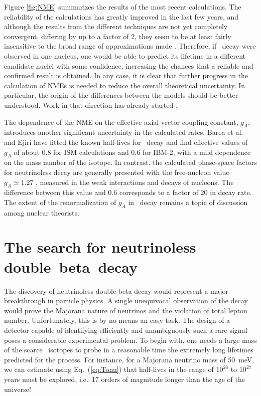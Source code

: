 \documentclass{PoS}
\begin{document}
Figure \ref{fig:NME} summarizes the results of the most recent calculations. The reliability of the calculations has greatly improved in the last few years, and although the results from the different techniques are not yet completely convergent, differing by up to a factor of 2, they seem to be at least fairly insensitive to the broad range of approximations made \cite{Vogel:2012ja}. Therefore, if \bbonu\ decay were observed in one nucleus, one would be able to predict its lifetime in a different candidate nuclei with some confidence, increasing the chances that a reliable and confirmed result is obtained. In any case, it is clear that further progress in the calculation of NMEs is needed to reduce the overall theoretical uncertainty. In particular, the origin of the differences between the models should be better understood. Work in that direction has already started \cite{Menendez:2014ena}.

The dependence of the NME on the effective axial-vector coupling constant, $g_{A}$, introduces another significant uncertainty in the calculated rates. Barea et al.\ \cite{Barea:2013bz} and Ejiri \cite{Ejiri:2010zza} have fitted the known half-lives for \bbtnu\ decay and find effective values of $g_{A}$ of about 0.8 for ISM calculations and 0.6 for IBM-2, with a mild dependence on the mass number of the isotope. In contrast, the calculated phase-space factors for neutrinoless decay are generally presented with the free-nucleon value $g_{A} \simeq1.27$ \cite{Agashe:2014kda}, measured in the weak interactions and decays of nucleons. The difference between this value and 0.6 corresponds to a factor of 20 in decay rate. The extent of the renormalization of $g_{A}$ in \bbonu\ decay remains a topic of discussion among nuclear theorists.
 
\section{The search for neutrinoless \mbox{double beta decay}} 
The discovery of neutrinoless double beta decay would represent a major breakthrough in particle physics. A single unequivocal observation of the decay would prove the Majorana nature of neutrinos and the violation of total lepton number. Unfortunately, this is by no means an easy task. The design of a detector capable of identifying efficiently and unambiguously such a rare signal poses a considerable experimental problem. To begin with, one needs a large mass of the scarce \bb\ isotopes to probe in a reasonable time the extremely long lifetimes predicted for the process. For instance, for a Majorana neutrino mass of 50~meV, we can estimate using Eq.~(\ref{eq:Tonu}) that half-lives in the range of $10^{26}$ to $10^{27}$ years must be explored, i.e.\ 17 orders of magnitude longer than the age of the universe! 
\end{document}
